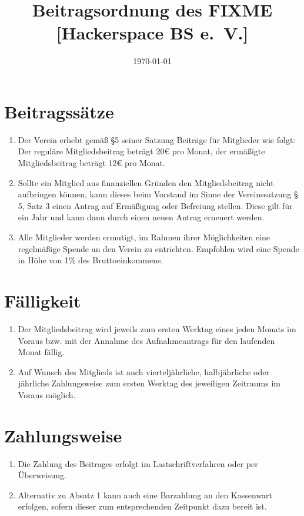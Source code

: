 \documentclass[a4paper,11pt]{scrartcl}
\title{Beitragsordnung des FIXME [Hackerspace BS e.~V.]}
\date{\today}
\begin{document}
\maketitle

\section{Beitragssätze}
\begin{enumerate}
  \item Der Verein erhebt gemäß §5 seiner Satzung Beiträge für Mitglieder wie folgt: Der reguläre Mitgliedsbeitrag beträgt 20€ pro Monat, der ermäßigte Mitgliedsbeitrag beträgt 12€ pro Monat.
  \item Sollte ein Mitglied aus finanziellen Gründen den Mitgliedsbeitrag nicht aufbringen können, kann dieses beim Vorstand im Sinne der Vereinssatzung § 5, Satz 3 einen Antrag auf Ermäßigung oder Befreiung stellen. Diese gilt für ein Jahr und kann dann durch einen neuen Antrag erneuert werden.
  \item Alle Mitglieder werden ermutigt, im Rahmen ihrer Möglichkeiten eine regelmäßige Spende an den Verein zu entrichten. Empfohlen wird eine Spende in Höhe von 1\% des Bruttoeinkommens.
\end{enumerate}

\section{Fälligkeit}
\begin{enumerate}
  \item Der Mitgliedsbeitrag wird jeweils zum ersten Werktag eines jeden Monats im Voraus bzw. mit der Annahme des Aufnahmeantrags für den laufenden Monat fällig.
  \item Auf Wunsch des Mitglieds ist auch vierteljährliche, halbjährliche oder jährliche Zahlungsweise zum ersten Werktag des jeweiligen Zeitraums im Voraus möglich.
\end{enumerate}

\section{Zahlungsweise}
\begin{enumerate}
  \item Die Zahlung des Beitrages erfolgt im Lastschriftverfahren oder per Überweisung.
  \item Alternativ zu Absatz 1 kann auch eine Barzahlung an den Kassenwart erfolgen, sofern  dieser zum entsprechenden Zeitpunkt dazu bereit ist.
\end{enumerate}
\end{document}
